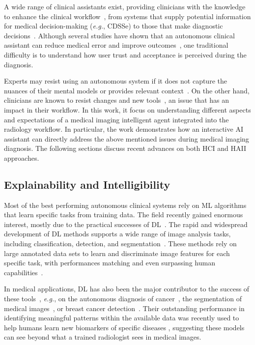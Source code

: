 A wide range of clinical assistants exist, providing clinicians with the knowledge to enhance the clinical workflow~\cite{Cai:2019:HTC:3290605.3300234, edge2019clinical}, from systems that supply potential information for medical decision-making ({\it e.g.}, \ac{CDSSe}) to those that make diagnostic decisions~\cite{hwang2019artificial}.
Although several studies have shown that an autonomous clinical assistant can reduce medical error and improve outcomes~\cite{Cai:2019:HTC:3290605.3300234, Cai:2019:EEE:3301275.3302289}, one traditional difficulty is to understand how user trust and acceptance is perceived during the diagnosis.

Experts may resist using an autonomous system if it does not capture the nuances of their mental models or provides relevant context~\cite{khairat2018reasons, kohli2018cad, yang2016investigating}.
On the other hand, clinicians are known to resist changes and new tools~\cite{10.1145/3132272.3134111, gagnon2014electronic}, an issue that has an impact in their workflow.
In this work, it focus on understanding different aspects and expectations of a medical imaging intelligent agent integrated into the radiology workflow.
In particular, the work demonstrates how an interactive \ac{AI} assistant can directly address the above mentioned issues during medical imaging diagnosis.
The following sections discuss recent advances on both \ac{HCI} and \ac{HAII} approaches.

\subsection{Explainability and Intelligibility}
\label{sec:app002002001}

Most of the best performing autonomous clinical systems rely on \ac{ML} algorithms that learn specific tasks from training data.
The field recently gained enormous interest, mostly due to the practical successes of \ac{DL}~\cite{meacham2019towards}.
The rapid and widespread development of \ac{DL} methods supports a wide range of image analysis tasks, including classification, detection, and segmentation~\cite{lecun2015deep}.
These methods rely on large annotated data sets to learn and discriminate image features for each specific task, with performances matching and even surpassing human capabilities~\cite{esteva2017dermatologist}.

In medical applications, \ac{DL} has also been the major contributor to the success of these tools~\cite{esteva2019guide}, \textit{e.g.}, on the autonomous diagnosis of cancer~\cite{esteva2017dermatologist}, the segmentation of medical images~\cite{medley2019segmenting}, or breast cancer detection~\cite{MAICAS2019101562}.
Their outstanding performance in identifying meaningful patterns within the available data was recently used to help humans learn new biomarkers of specific diseases \cite{cole2017predicting,gonzalez2018deep,wang2019deep}, suggesting these models can see beyond what a trained radiologist sees in medical images.

